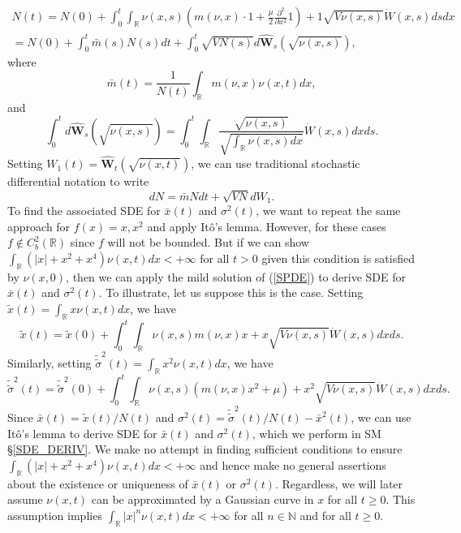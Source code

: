\documentclass[]{article}
\begin{document}
\begin{multline}
N(t)=N(0)+\int_0^t\int_\mathbb{R}\nu(x,s)\left(m(\nu,x)\cdot1+\frac{\mu}{2}\frac{\partial^2}{\partial x^2}1\right)+1\sqrt{V\nu(x,s)}\dot W(x,s)dsdx \\
=N(0)+\int_0^t\bar m(s)N(s)dt+\int_0^t\sqrt{VN(s)}d\hat{\mathbf{W}}_s(\sqrt{\nu(x,s)}),
\end{multline} where \begin{equation}
\bar m(t)=\frac{1}{N(t)}\int_\mathbb{R}m(\nu,x)\nu(x,t)dx,
\end{equation} and \begin{equation}
\int_0^td\hat{\mathbf{W}}_s(\sqrt{\nu(x,s)})=\int_0^t\int_\mathbb{R}\frac{\sqrt{\nu(x,s)}}{\sqrt{\int_\mathbb{R}\nu(x,s)dx}}\dot W(x,s)dxds.
\end{equation} Setting \(W_1(t)=\hat{\mathbf{W}}_t(\sqrt{\nu(x,t)})\),
we can use traditional stochastic differential notation to write
\begin{equation}
dN=\bar mNdt+\sqrt{VN}dW_1.
\end{equation} To find the associated SDE for \(\bar x(t)\) and
\(\sigma^2(t)\), we want to repeat the same approach for \(f(x)=x,x^2\)
and apply Itô's lemma. However, for these cases
\(f\notin C^2_b(\mathbb{R})\) since \(f\) will not be bounded. But if we
can show \(\int_\mathbb{R}(|x|+x^2+x^4)\nu(x,t)dx<+\infty\) for all
\(t>0\) given this condition is satisfied by \(\nu(x,0)\), then we can
apply the mild solution of (\ref{SPDE}) to derive SDE for \(\bar x(t)\)
and \(\sigma^2(t)\). To illustrate, let us suppose this is the case.
Setting \(\tilde x(t)=\int_\mathbb{R}x\nu(x,t)dx\), we have
\begin{equation}
\tilde x(t)=\tilde x(0)+\int_0^t\int_\mathbb{R}\nu(x,s)m(\nu,x)x+x\sqrt{V\nu(x,s)}\dot W(x,s)dxds.
\end{equation} Similarly, setting
\(\tilde{\tilde\sigma}^2(t)=\int_\mathbb{R}x^2\nu(x,t)dx\), we have
\begin{equation}
\tilde{\tilde\sigma}^2(t)=\tilde{\tilde\sigma}^2(0)+\int_0^t\int_\mathbb{R}\nu(x,s)\left(m(\nu,x)x^2+\mu\right)+x^2\sqrt{V\nu(x,s)}\dot W(x,s)dxds.
\end{equation} Since \(\bar x(t)=\tilde x(t)/N(t)\) and
\(\sigma^2(t)=\tilde{\tilde\sigma}^2(t)/N(t)-\bar x^2(t)\), we can use
Itô's lemma to derive SDE for \(\bar x(t)\) and \(\sigma^2(t)\), which
we perform in SM \S\ref{SDE_DERIV}. We make no attempt in finding
sufficient conditions to ensure
\(\int_\mathbb{R}(|x|+x^2+x^4)\nu(x,t)dx<+\infty\) and hence make no
general assertions about the existence or uniqueness of \(\bar x(t)\) or
\(\sigma^2(t)\). Regardless, we will later assume \(\nu(x,t)\) can be
approximated by a Gaussian curve in \(x\) for all \(t\geq0\). This
assumption implies \(\int_\mathbb{R}|x|^n\nu(x,t)dx<+\infty\) for all
\(n\in\mathbb{N}\) and for all \(t\geq0\).
\end{document}
